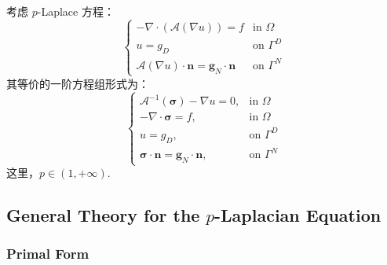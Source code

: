 考虑 \(p\)-Laplace 方程：
\begin{equation}\label{p-Laplace primal form}
	\begin{cases}
		-\nabla \cdot \left(\mathcal{A}(\nabla u)\right) = f & \text{in \(\Omega\)} \\
		u = g_{D} & \text{on \(\Gamma^{D}\)} \\
		\mathcal{A}(\nabla u) \cdot \bm n = \bm g_{N} \cdot \bm n & \text{on \(\Gamma^{N}\)}
	\end{cases}
\end{equation}
其等价的一阶方程组形式为：
\begin{equation}\label{p-Laplace mixed form}
	\begin{cases}
		\mathcal{A}^{-1}(\bm\sigma) - \nabla u = 0, & \text{in \(\Omega\)} \\
		-\nabla \cdot \bm\sigma = f, & \text{in \(\Omega\)} \\
		u = g_{D}, & \text{on \(\Gamma^{D}\)} \\
		\bm\sigma \cdot \bm n = \bm g_{N} \cdot \bm n, & \text{on \(\Gamma^{N}\)}
	\end{cases}
\end{equation}
这里，\(p\in(1,+\infty)\).


\subsection{General Theory for the \texorpdfstring{\(p\)}{p}-Laplacian Equation}


\subsubsection{Primal Form}

